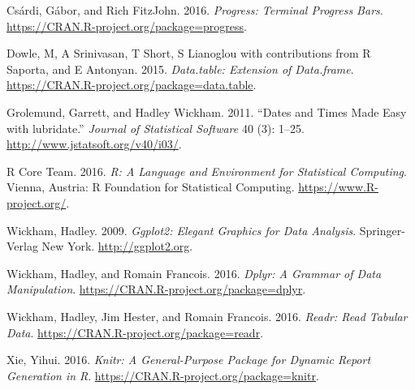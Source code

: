 \documentclass[]{article}
\begin{document}
\hypertarget{refs}{}
\hypertarget{ref-progress}{}
Csárdi, Gábor, and Rich FitzJohn. 2016. \emph{Progress: Terminal
Progress Bars}. \url{https://CRAN.R-project.org/package=progress}.

\hypertarget{ref-data.table}{}
Dowle, M, A Srinivasan, T Short, S Lianoglou with contributions from R
Saporta, and E Antonyan. 2015. \emph{Data.table: Extension of
Data.frame}. \url{https://CRAN.R-project.org/package=data.table}.

\hypertarget{ref-lubridate}{}
Grolemund, Garrett, and Hadley Wickham. 2011. ``Dates and Times Made
Easy with lubridate.'' \emph{Journal of Statistical Software} 40 (3):
1--25. \url{http://www.jstatsoft.org/v40/i03/}.

\hypertarget{ref-baseR}{}
R Core Team. 2016. \emph{R: A Language and Environment for Statistical
Computing}. Vienna, Austria: R Foundation for Statistical Computing.
\url{https://www.R-project.org/}.

\hypertarget{ref-ggplot2}{}
Wickham, Hadley. 2009. \emph{Ggplot2: Elegant Graphics for Data
Analysis}. Springer-Verlag New York. \url{http://ggplot2.org}.

\hypertarget{ref-dplyr}{}
Wickham, Hadley, and Romain Francois. 2016. \emph{Dplyr: A Grammar of
Data Manipulation}. \url{https://CRAN.R-project.org/package=dplyr}.

\hypertarget{ref-readr}{}
Wickham, Hadley, Jim Hester, and Romain Francois. 2016. \emph{Readr:
Read Tabular Data}. \url{https://CRAN.R-project.org/package=readr}.

\hypertarget{ref-knitr}{}
Xie, Yihui. 2016. \emph{Knitr: A General-Purpose Package for Dynamic
Report Generation in R}. \url{https://CRAN.R-project.org/package=knitr}.
\end{document}
